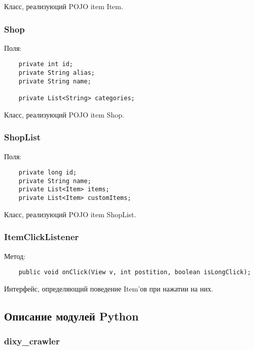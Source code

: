 Класс, реализуюций POJO item Item.


\subsubsection{Shop}
Поля:\\
\begin{small}
    \begin{verbatim}
    private int id;
    private String alias;
    private String name;

    private List<String> categories;
\end{verbatim}
\end{small}

Класс, реализуюций POJO item Shop.


\subsubsection{ShopList}
Поля:\\
\begin{small}
    \begin{verbatim}
    private long id;
    private String name;
    private List<Item> items;
    private List<Item> customItems;
\end{verbatim}
\end{small}

Класс, реализуюций POJO item ShopList.


\subsubsection{ItemClickListener}
Метод:\\
\begin{small}
    \begin{verbatim}
    public void onClick(View v, int postition, boolean isLongClick);
\end{verbatim}
\end{small}
Интерфейс, определяющий поведение Item'ов при нажатии на них.



\subsection{Описание модулей Python}

\subsubsection{dixy\_crawler}

